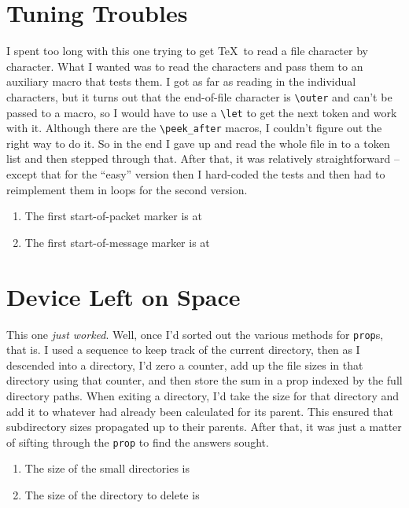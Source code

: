 \documentclass{article}
\begin{document}
\section{Tuning Troubles}

I spent too long with this one trying to get \TeX\ to read a file character by character.
What I wanted was to read the characters and pass them to an auxiliary macro that tests them.
I got as far as reading in the individual characters, but it turns out that the end-of-file character is \Verb!\outer! and can't be passed to a macro, so I would have to use a \Verb!\let! to get the next token and work with it.
Although there are the \Verb!\peek_after! macros, I couldn't figure out the right way to do it.
So in the end I gave up and read the whole file in to a token list and then stepped through that.
After that, it was relatively straightforward -- except that for the ``easy'' version then I hard-coded the tests and then had to reimplement them in loops for the second version.


\begin{enumerate}
\item The first start-of-packet marker is at 
\item The first start-of-message marker is at 
\end{enumerate}

\section{Device Left on Space}

This one \emph{just worked}.
Well, once I'd sorted out the various methods for \Verb!prop!s, that is.
I used a sequence to keep track of the current directory, then as I descended into a directory, I'd zero a counter, add up the file sizes in that directory using that counter, and then store the sum in a prop indexed by the full directory paths.
When exiting a directory, I'd take the size for that directory and add it to whatever had already been calculated for its parent.
This ensured that subdirectory sizes propagated up to their parents.
After that, it was just a matter of sifting through the \Verb!prop! to find the answers sought.

\begin{enumerate}
\item The size of the small directories is 
\item The size of the directory to delete is 
\end{enumerate}
\end{document}
